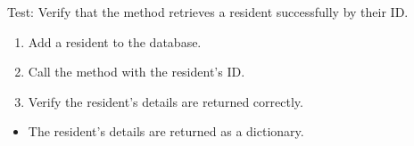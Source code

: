 \documentclass[letterpaper,10pt,english]{sphinxmanual}
\begin{document}
\begin{fulllineitems}
\label{\detokenize{test:test.test_residetnt.test_get_resident_by_id_success}}
\pysigstartsignatures
\pysiglinewithargsret
{}
{}
{}
\pysigstopsignatures
\sphinxAtStartPar
Test: Verify that the method retrieves a resident successfully by their ID.
\begin{description}
\begin{enumerate}
%
\item {} 
\sphinxAtStartPar
Add a resident to the database.

\item {} 
\sphinxAtStartPar
Call the  method with the resident’s ID.

\item {} 
\sphinxAtStartPar
Verify the resident’s details are returned correctly.

\end{enumerate}

\begin{itemize}
\item {} 
\sphinxAtStartPar
The resident’s details are returned as a dictionary.

\end{itemize}

\end{description}

\end{fulllineitems}

\end{document}
